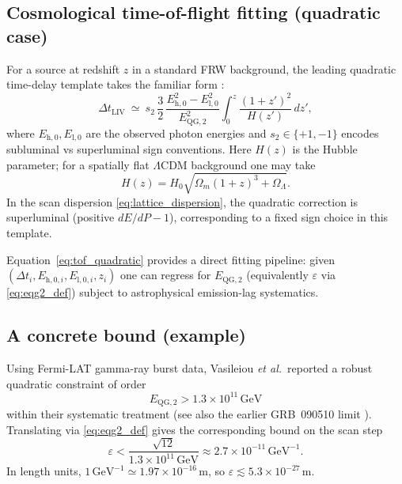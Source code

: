 \subsection{Cosmological time-of-flight fitting (quadratic case)}
For a source at redshift $z$ in a standard FRW background, the leading quadratic time-delay template takes the familiar form \cite{JacobPiran2008}:
\begin{equation}
\Delta t_{\mathrm{LIV}}\ \simeq\ s_2\,\frac{3}{2}\,\frac{E_{\mathrm{h},0}^2-E_{\mathrm{l},0}^2}{E_{\mathrm{QG},2}^2}\int_0^z\frac{(1+z')^2}{H(z')}\,dz',
\label{eq:tof_quadratic}
\end{equation}
where $E_{\mathrm{h},0},E_{\mathrm{l},0}$ are the observed photon energies and $s_2\in\{+1,-1\}$ encodes subluminal vs superluminal sign conventions.
Here $H(z)$ is the Hubble parameter; for a spatially flat $\Lambda$CDM background one may take
\begin{equation}
H(z)=H_0\sqrt{\Omega_m(1+z)^3+\Omega_\Lambda}.
\end{equation}
In the scan dispersion \eqref{eq:lattice_dispersion}, the quadratic correction is superluminal (positive $dE/dP-1$), corresponding to a fixed sign choice in this template.

Equation~\eqref{eq:tof_quadratic} provides a direct fitting pipeline: given $(\Delta t_i,E_{\mathrm{h},0,i},E_{\mathrm{l},0,i},z_i)$ one can regress for $E_{\mathrm{QG},2}$ (equivalently $\varepsilon$ via \eqref{eq:eqg2_def}) subject to astrophysical emission-lag systematics.

\subsection{A concrete bound (example)}
Using Fermi-LAT gamma-ray burst data, Vasileiou \emph{et al.}\ reported a robust quadratic constraint of order
\begin{equation}
E_{\mathrm{QG},2} > 1.3\times 10^{11}\,\mathrm{GeV}
\end{equation}
within their systematic treatment \cite{Vasileiou2013} (see also the earlier GRB~090510 limit \cite{Abdo2009Nature}).
Translating via \eqref{eq:eqg2_def} gives the corresponding bound on the scan step
\begin{equation}
\varepsilon < \frac{\sqrt{12}}{1.3\times 10^{11}\,\mathrm{GeV}}\approx 2.7\times 10^{-11}\,\mathrm{GeV}^{-1}.
\end{equation}
In length units, $1\,\mathrm{GeV}^{-1}\simeq 1.97\times 10^{-16}\,\mathrm{m}$, so $\varepsilon\lesssim 5.3\times 10^{-27}\,\mathrm{m}$.

